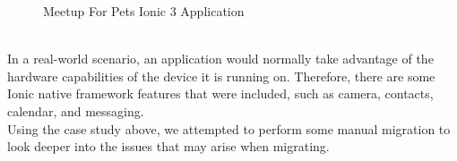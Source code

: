 \documentclass[conference]{IEEEtran}
\begin{document}
\begin{figure}
    \qquad
    \caption{Meetup For Pets Ionic 3 Application}%
    \label{fig:meetupIonic}%
\end{figure}
\\ In a real-world scenario, an application would normally take advantage of the hardware capabilities of the device it is running on. 
Therefore, there are some Ionic native framework features that were included, such as camera, contacts, calendar, and messaging.
\\ Using the case study above, we attempted to perform some manual migration to look deeper into the issues that may arise when migrating. 
\end{document}
